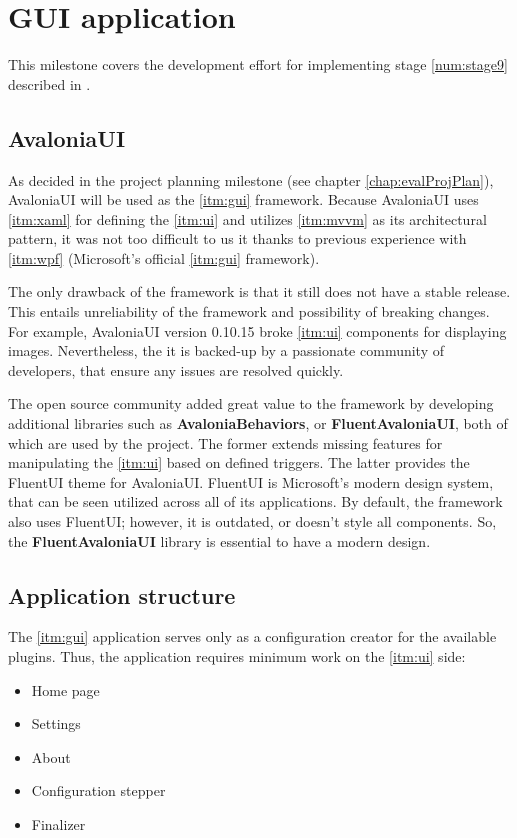 \chapter{GUI application}

This milestone covers the development effort for implementing stage \ref{num:stage9} described in .

\section{AvaloniaUI}

As decided in the project planning milestone (see chapter \ref{chap:evalProjPlan}), AvaloniaUI will be used as the \ref{itm:gui} framework.
Because AvaloniaUI uses \ref{itm:xaml} for defining the \ref{itm:ui} and utilizes \ref{itm:mvvm} as its architectural pattern, it was not too difficult to us it thanks to previous experience with \ref{itm:wpf} (Microsoft's official \ref{itm:gui} framework).

The only drawback of the framework is that it still does not have a stable release. This entails unreliability of the framework and possibility of breaking changes. For example, AvaloniaUI version 0.10.15 broke \ref{itm:ui} components for displaying images. Nevertheless, the it is backed-up by a passionate community of developers, that ensure any issues are resolved quickly.

The open source community added great value to the framework by developing additional libraries such as \textbf{AvaloniaBehaviors}, or \textbf{FluentAvaloniaUI}, both of which are used by the project. The former extends missing features for manipulating the \ref{itm:ui} based on defined triggers. The latter provides the FluentUI theme for AvaloniaUI. FluentUI is Microsoft's modern design system, that can be seen utilized across all of its applications. By default, the framework also uses FluentUI; however, it is outdated, or doesn't style all components. So, the \textbf{FluentAvaloniaUI} library is essential to have a modern design.

\section{Application structure}

The \ref{itm:gui} application serves only as a configuration creator for the available plugins. Thus, the application requires minimum work on the \ref{itm:ui} side:
\begin{itemize}
    \item Home page
    \item Settings
    \item About
    \item Configuration stepper
    \item Finalizer
\end{itemize}

